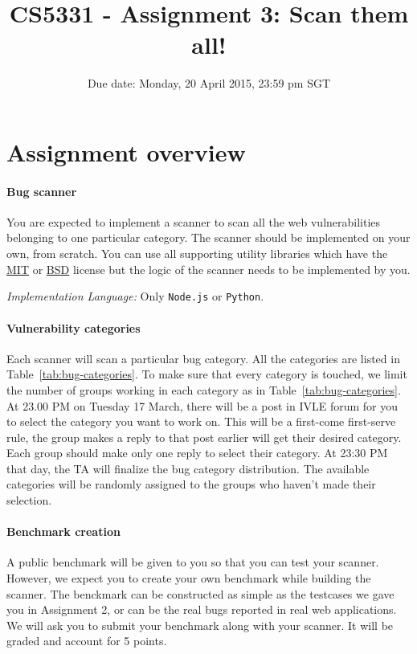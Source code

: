 \documentclass{article}[10pt]
\title{CS5331 - Assignment 3: Scan them all!}
\date{Due date: Monday, 20 April 2015, 23:59 pm SGT}
\begin{document}
\maketitle


\section{Assignment overview}

\paragraph{Bug scanner} You are expected to implement a scanner to scan all the web vulnerabilities belonging to one particular category. The scanner should be implemented on your own, from scratch. You can use all supporting utility libraries which have the \href{http://opensource.org/licenses/MIT}{MIT} or \href{http://en.wikipedia.org/wiki/BSD_licenses}{BSD} license but the logic of the scanner needs to be implemented by you.

\textit{Implementation Language:} Only {\tt Node.js} or {\tt Python}.

\paragraph{Vulnerability categories} Each scanner will scan a particular bug category. All the categories are listed in Table~\ref{tab:bug-categories}. To make sure that every category is touched, we limit the number of groups working in each category as in Table~\ref{tab:bug-categories}. At 23.00 PM on Tuesday 17 March, there will be a post in IVLE forum for you to select the category you want to work on. This will be a first-come first-serve rule, the group makes a reply to that post earlier will get their desired category. Each group should make only one reply to select their category. At 23:30 PM that day, the TA will finalize the bug category distribution. The available categories will be randomly assigned to the groups who haven't made their selection.

\paragraph{Benchmark creation} A public benchmark will be given to you so that you can test your scanner. However, we expect you to create your own benchmark while building the scanner. The benckmark can be constructed as simple as the testcases we gave you in Assignment 2, or can be the real bugs reported in real web applications.
We will ask you to submit your benchmark along with your scanner. It will be graded and account for 5 points.
\end{document}
